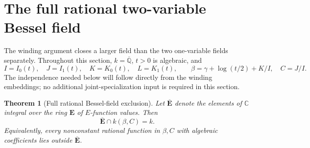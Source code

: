 \documentclass[11pt]{article}
\newtheorem{theorem}{Theorem}[section]
\theoremstyle{definition}
\theoremstyle{remark}
\newcommand{\E}{\mathbf E}
\newcommand{\Ebar}{\overline{\mathbf E}}
\begin{document}


\section{The full rational two-variable Bessel field}
\label{brp:section}

The winding argument closes a larger field than the two one-variable
fields separately.  Throughout this section, $k=\overline{\mathbb Q}$,
$t>0$ is algebraic, and
\[
 I=I_0(t),\quad J=I_1(t),\quad K=K_0(t),\quad L=K_1(t),\qquad
 \beta=\gamma+\log(t/2)+K/I,\quad C=J/I.
\]
The independence needed below will follow directly from the winding
embeddings; no additional joint-specialization input is required in
this section.

\begin{theorem}[Full rational Bessel-field exclusion]
\label{brp:main}
Let $\Ebar$ denote the elements of $\mathbb C$ integral
over the ring $\E$ of $E$-function values.  Then
\[
 \boxed{\ \Ebar\cap k(\beta,C)=k.\ }
\]
Equivalently, every nonconstant rational function in $\beta,C$ with
algebraic coefficients lies outside $\Ebar$.
\end{theorem}
\end{document}
